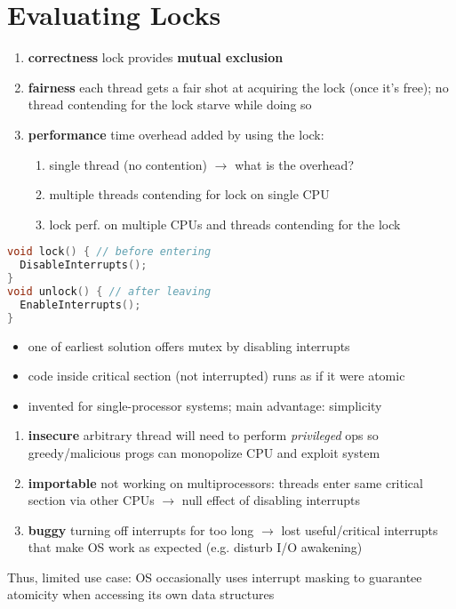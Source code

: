 \section*{Evaluating Locks}
\begin{enumerate}
\item \textbf{correctness} lock provides \textbf{mutual exclusion}
\item \textbf{fairness} each thread gets a fair shot at acquiring the lock (once it's free); no thread contending for the lock starve while doing so
\item \textbf{performance} time overhead added by using the lock:
  \begin{enumerate}
  \item single thread (no contention) $\to$ what is the overhead?
  \item multiple threads contending for lock on single CPU
  \item lock perf. on multiple CPUs and threads contending for the lock
  \end{enumerate}
\end{enumerate}
\begin{minipage}{.5\linewidth}
\begin{lstlisting}[language=c,xrightmargin=2pt]
void lock() { // before entering
  DisableInterrupts();
}
void unlock() { // after leaving
  EnableInterrupts();
}
\end{lstlisting}
\end{minipage}
\begin{minipage}{.5\linewidth}
  \begin{itemize}
  \item one of earliest solution offers mutex by disabling interrupts
  \item code inside critical section (not interrupted) runs as if it were atomic
  \item invented for single-processor systems;  main advantage: simplicity
  \end{itemize}
\end{minipage}
\begin{enumerate}
\item \textbf{insecure} arbitrary thread will need to perform \emph{privileged} ops so greedy/malicious progs can monopolize CPU and exploit system
\item \textbf{importable} not working on multiprocessors: threads enter same critical section via other CPUs $\to$ null effect of disabling interrupts
\item \textbf{buggy} turning off interrupts for too long $\to$ lost useful/critical interrupts that make OS work as expected (e.g. disturb I/O awakening)
\end{enumerate}
Thus, limited use case: OS occasionally uses interrupt masking to guarantee atomicity when accessing its own data structures
